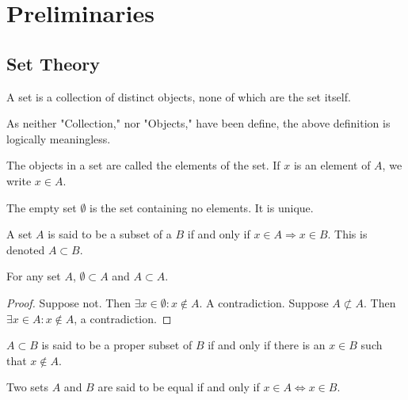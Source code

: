 \documentclass[crop=false,class=article,oneside]{standalone}
\begin{document}
    \ifx\ifworkmasterswork\undefined
        \section*{Preliminaries}
        \setcounter{section}{1}
        \graphicspath{{../../../images/}}
    \fi
    \subsection{Set Theory}
        \begin{definition}
            A set is a collection of distinct objects,
            none of which are the set itself.
        \end{definition}
        \begin{remark}
        As neither "Collection," nor "Objects," have been define, the above definition is logically meaningless.
        \end{remark}
        \begin{definition}
        The objects in a set are called the elements of the set. If $x$ is an element of $A$, we write $x\in A$.
        \end{definition}
        \begin{definition}
        The empty set $\emptyset$ is the set containing no elements. It is unique.
        \end{definition}
        \begin{definition}
        A set $A$ is said to be a subset of a $B$ if and only if $x\in A\Rightarrow x\in B$. This is denoted $A\subset B$.
        \end{definition}
        \begin{corollary}
        For any set $A$, $\emptyset \subset A$ and $A\subset A$.
        \end{corollary}
        \begin{proof}
        Suppose not. Then $\exists x\in \emptyset: x\notin A$. A contradiction. Suppose $A\not\subset A$. Then $\exists x\in A:x\notin A$, a contradiction.
        \end{proof}
        \begin{definition}
        $A\subset B$ is said to be a proper subset of $B$ if and only if there is an $x\in B$ such that $x\notin A$.
        \end{definition}
        \begin{definition}
        Two sets $A$ and $B$ are said to be equal if and only if $x\in A \Leftrightarrow x\in B$.
        \end{definition}
\end{document}
